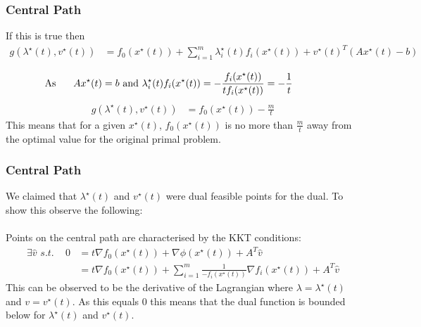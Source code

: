 \documentclass{beamer}
\begin{document}
\begin{frame}
    \frametitle{Central Path}
    If this is true then
    {\footnotesize
        \begin{align*}
            g(\lambda^{\star}(t), v^{\star}(t)) &= f_{0}(x^{\star}(t))
            + \sum\limits_{i=1}^{m}\lambda_{i}^{\star}(t)f_{i}(x^{\star}(t))
            + v^{\star}(t)^{T}(Ax^{\star}(t) - b) \\
        \end{align*}
    }
    \vspace{-10mm}
    \begin{align*}
        \hspace{-10mm}\text{As }\hspace{5mm}  Ax^{\star}(t) = b \text{ and } \lambda_{i}^{\star}(t)f_{i}(x^{\star}(t))
        = -\frac{f_{i}(x^{\star}(t))}{t f_{i}(x^{\star}(t))}
        = -\frac{1}{t}
    \end{align*}
    \begin{align*}
        g(\lambda^{\star}(t), v^{\star}(t)) &= f_{0}(x^{\star}(t)) -
        \frac{m}{t}
    \end{align*}
    This means that for a given $x^{\star}(t)$, $f_{0}(x^{\star}(t))$ is no more than
    $\frac{m}{t}$ away from the optimal value for the original primal problem.
\end{frame}

\begin{frame}
    \frametitle{Central Path}
    We claimed that $\lambda^{\star}(t)$ and $v^{\star}(t)$ were dual feasible
    points for the dual. To show this observe the following:
    \\~\\
    Points on the central path are characterised by the KKT conditions:
    {\footnotesize
    \begin{align*}
        \exists \hat{v}\,\, s.t.  \, \, \,\, \, \, \,
        0 &= t\nabla f_{0}(x^{\star}(t)) + \nabla\phi(x^{\star}(t)) +
        A^{T}\hat{v} \\
        &= t \nabla f_{0}(x^{\star}(t)) +
        \sum\limits_{i=1}^{m}\frac{1}{-f_{i}(x^{\star}(t))}\nabla
        f_{i}(x^{\star}(t)) + A^{T}\hat{v}
    \end{align*}}
    This can be observed to be the derivative of the Lagrangian where $\lambda =
    \lambda^{\star}(t)$ and $v = v^{\star}(t)$. As this equals 0 this means that
    the dual function is bounded below for $\lambda^{\star}(t)$ and
    $v^{\star}(t)$.
\end{frame}
\end{document}
